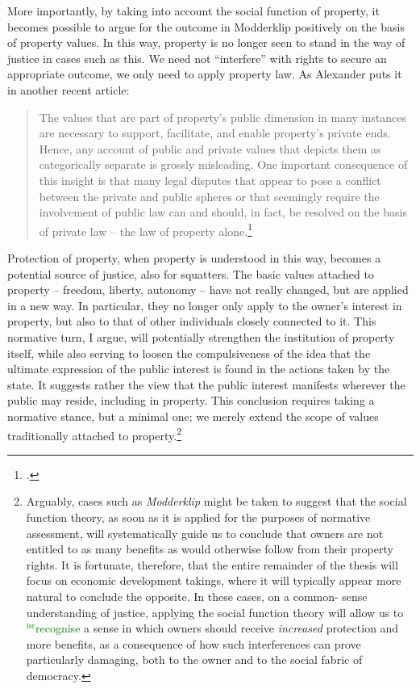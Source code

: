 \documentclass[12pt,a4paper]{book} %
\newcommand{\isr}[1]{\textcolor{green}{$^{\textrm{isr}}${#1}}}
\begin{document}
More importantly, by taking into account the social function of property, it becomes possible to argue for the outcome in Modderklip positively on the basis of property values. In this way, property is no longer seen to stand in the way of justice in cases such as this. We need not ``interfere'' with rights to secure an appropriate outcome, we only need to apply property law. As Alexander puts it in another recent article: 

\begin{quote} The values that are
part of property's public dimension in many instances are necessary
to support, facilitate, and enable property's private ends.
Hence, any account of public and private values that depicts them as categorically
separate is grossly misleading. One important consequence of this
insight is that many legal disputes that appear to pose a conflict between
the private and public spheres or that seemingly
require the involvement of public law can and
should, in fact, be resolved on the basis of private law -- the law
of property alone.\footcite[1295-1296]{alexander14} \end{quote}

Protection of property, when property is understood in this way, becomes a potential source of justice, also for squatters. The basic values attached to property -- freedom, liberty, autonomy -- have not really changed, but are applied in a new way. In particular, they no longer only apply to the owner's interest in property, but also to that of other individuals closely connected to it. This normative turn, I argue, will potentially strengthen the institution of property itself, while also serving to loosen the compulsiveness of the idea that the ultimate expression of the public interest is found in the actions taken by the state. It suggests rather the view that the public interest manifests wherever the public may reside, including in property. This conclusion requires taking a normative stance, but a minimal one; we merely extend the scope of values traditionally attached to property.\footnote{Arguably, cases such as {\it Modderklip} might be taken to suggest that the social function theory, as soon as it is applied for the purposes of normative assessment, will systematically guide us to conclude that owners are not entitled to as many benefits as would otherwise follow from their property rights. It is fortunate, therefore, that the entire remainder of the thesis will focus on economic development takings, where it will typically appear more natural to conclude the opposite. In these cases, on a common- sense understanding of justice, applying the social function theory will allow us to \isr{recognise} a sense in which owners should receive {\it increased} protection and more benefits, as a consequence of how such interferences can prove particularly damaging, both to the owner and to the social fabric of democracy.} 
\end{document}
